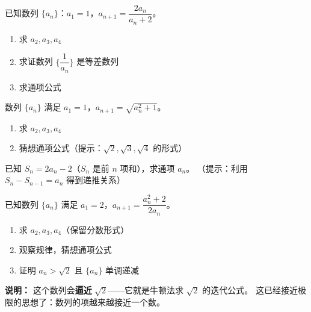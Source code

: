 
\begin{exercise}[6]
已知数列 \(\{a_n\}\)：\(a_1 = 1\)，\(a_{n+1} = \dfrac{2a_n}{a_n + 2}\)。
\begin{enumerate}
  \item[(1)] 求 \(a_2, a_3, a_4\)
  \item[(2)] 求证数列 \(\{\dfrac{1}{a_n}\}\) 是等差数列
  \item[(3)] 求通项公式
\end{enumerate}
\end{exercise}

\begin{exercise}[6]
数列 \(\{a_n\}\) 满足 \(a_1 = 1\)，\(a_{n+1} = \sqrt{a_n^2 + 1}\)。
\begin{enumerate}
  \item[(1)] 求 \(a_2, a_3, a_4\)
  \item[(2)] 猜想通项公式（提示：\(\sqrt{2}, \sqrt{3}, \sqrt{4}\) 的形式）
\end{enumerate}
\end{exercise}

\begin{exercise}[6]
已知 \(S_n = 2a_n - 2\)（\(S_n\) 是前 \(n\) 项和），求通项 \(a_n\)。
（提示：利用 \(S_n - S_{n-1} = a_n\) 得到递推关系）
\end{exercise}


\begin{exercise}[7]
已知数列 \(\{a_n\}\) 满足 \(a_1 = 2\)，\(a_{n+1} = \dfrac{a_n^2 + 2}{2a_n}\)。
\begin{enumerate}
  \item[(1)] 求 \(a_2, a_3, a_4\)（保留分数形式）
  \item[(2)] 观察规律，猜想通项公式
  \item[(3)] 证明 \(a_n > \sqrt{2}\) 且 \(\{a_n\}\) 单调递减
\end{enumerate}

\textbf{说明：} 这个数列会\textbf{逼近} \(\sqrt{2}\)——它就是牛顿法求 \(\sqrt{2}\) 的迭代公式。
这已经接近极限的思想了：数列的项越来越接近一个数。
\end{exercise}
